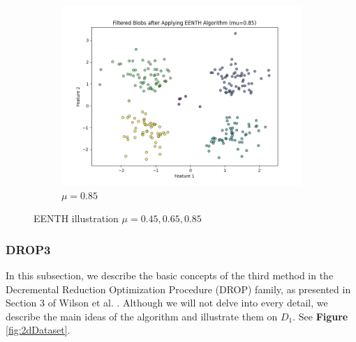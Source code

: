 \begin{figure}[htbp]
\begin{subfigure}[b]{0.3\textwidth}
		\centering
		\includegraphics[width=\textwidth]{figures/eenth/filtered_blobs_mu_0.85} %
		\caption{$\mu = 0.85$}
		\label{fig:85}
	\end{subfigure}
	\caption{EENTH illustration $\mu=0.45,0.65,0.85$}
	\label{fig:mu_variation_2}
\end{figure}




\subsubsection{DROP3}
In this subsection, we describe the basic concepts of the third method in the Decremental Reduction Optimization Procedure (DROP) family, as presented in Section 3 of Wilson et al. \cite{wilson2000reduction}. Although we will not delve into every detail, we describe the main ideas of the algorithm and illustrate them on $D_1$. See \textbf{Figure} \ref{fig:2dDataset}.

